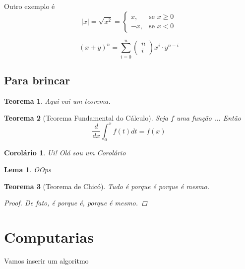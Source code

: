 \documentclass[10pt,a4paper,twocolumn]{book}
\newtheorem{teorema}{Teorema}
\newtheorem{corolario}{Corolário}[teorema]
\newtheorem{lema}{Lema}[corolario]
\begin{document}
			Outro exemplo é 
			\begin{equation}
				|x| = \sqrt{x^2} = 
					\begin{cases}
						x, &\text{se } x \ge 0 \\
						-x, &\text{se } x < 0 
					\end{cases}
			\end{equation}
			
			\begin{equation}
				(x+y)^n = \sum_{i=0}^{n} 
					\begin{pmatrix}
						n \\
						i
					\end{pmatrix}
				x^i\cdot y^{n-i}
			\end{equation}
			
	\subsection{Para brincar}
		\begin{teorema}
			Aqui vai um teorema.
		\end{teorema}
	
		\begin{teorema}[Teorema Fundamental do Cálculo]
			Seja $f$ uma função ...
			Então 
			\begin{equation}
			\frac{d}{dx}\int_{a}^{x}f(t)dt = f(x)
			\end{equation}
		\end{teorema}
	
		\begin{corolario}
			Ui! Olá sou um Corolário
		\end{corolario}
			
		\begin{lema}
			OOps
		\end{lema}
		
		\begin{teorema}[Teorema de Chicó] Tudo é porque é porque é mesmo.
			\begin{proof}
				De fato, é porque é, porque é mesmo.
			\end{proof}
		\end{teorema}
	
	
	\section{Computarias}
		Vamos inserir um algoritmo
\end{document}
